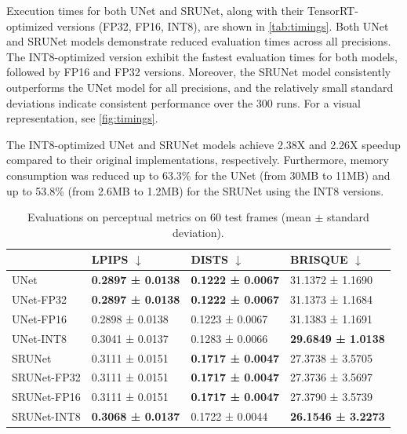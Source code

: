Execution times for both UNet and SRUNet, along with their TensorRT-optimized versions (FP32, FP16, INT8), are shown in \cref{tab:timings}. Both UNet and SRUNet models demonstrate reduced evaluation times across all precisions. The INT8-optimized version exhibit the fastest evaluation times for both models, followed by FP16 and FP32 versions.
Moreover, the SRUNet model consistently outperforms the UNet model for all precisions, and the relatively small standard deviations indicate consistent performance over the 300 runs.
For a visual representation, see \cref{fig:timings}.

The INT8-optimized UNet and SRUNet models achieve 2.38X and 2.26X speedup compared to their original implementations, respectively. Furthermore, memory consumption was reduced up to 63.3\% for the UNet (from 30MB to 11MB) and up to 53.8\% (from 2.6MB to 1.2MB) for the SRUNet using the INT8 versions.

\begin{table}[t]
\begin{tabular}{llll}
\toprule
{} & LPIPS $\downarrow$ & DISTS $\downarrow$ & BRISQUE $\downarrow$ \\
\midrule
UNet        &  \textbf{0.2897 ± 0.0138} &  \textbf{0.1222 ± 0.0067} &  31.1372 ± 1.1690 \\
UNet-FP32   &  \textbf{0.2897 ± 0.0138} &  \textbf{0.1222 ± 0.0067} &  31.1373 ± 1.1684 \\
UNet-FP16   &  0.2898 ± 0.0138 &  0.1223 ± 0.0067 &  31.1383 ± 1.1691 \\
UNet-INT8   &  0.3041 ± 0.0137 &  0.1283 ± 0.0066 &  \textbf{29.6849 ± 1.0138} \\
\midrule
SRUNet      &  0.3111 ± 0.0151 &  \textbf{0.1717 ± 0.0047} &  27.3738 ± 3.5705 \\
SRUNet-FP32 &  0.3111 ± 0.0151 &  \textbf{0.1717 ± 0.0047} &  27.3736 ± 3.5697 \\
SRUNet-FP16 &  0.3111 ± 0.0151 &  \textbf{0.1717 ± 0.0047} &  27.3790 ± 3.5739 \\
SRUNet-INT8 &  \textbf{0.3068 ± 0.0137} &  0.1722 ± 0.0044 &  \textbf{26.1546 ± 3.2273} \\
\bottomrule
\end{tabular}
\caption{Evaluations on perceptual metrics on 60 test frames (mean $\pm$ standard deviation).}
\label{tab:perceptual-metrics}
\end{table}

